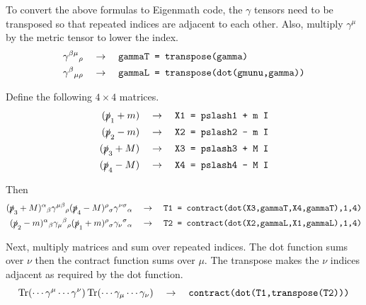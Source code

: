 \documentclass[12pt]{article}
\begin{document}
\noindent
To convert the above formulas to Eigenmath code,
the $\gamma$ tensors need to be transposed
so that repeated indices are adjacent to each other.
Also, multiply $\gamma^\mu$ by the metric tensor to lower the index.
\begin{align*}
\gamma^{\beta\mu}{}_\rho\quad&\rightarrow\quad
\text{\tt gammaT = transpose(gamma)}\\
\gamma^\beta{}_{\mu\rho}\quad&\rightarrow\quad
\text{\tt gammaL = transpose(dot(gmunu,gamma))}
\end{align*}

\noindent
Define the following $4\times4$ matrices.
\begin{align*}
(\slashed{p}_1+m)\quad&\rightarrow\quad\text{\tt X1 = pslash1 + m I}\\
(\slashed{p}_2-m)\quad&\rightarrow\quad\text{\tt X2 = pslash2 - m I}\\
(\slashed{p}_3+M)\quad&\rightarrow\quad\text{\tt X3 = pslash3 + M I}\\
(\slashed{p}_4-M)\quad&\rightarrow\quad\text{\tt X4 = pslash4 - M I}
\end{align*}

\noindent
Then
\begin{align*}
(\slashed{p}_3+M)^\alpha{}_\beta
\gamma^{\mu\beta}{}_\rho
(\slashed{p}_4-M)^\rho{}_\sigma
\gamma^{\nu\sigma}{}_\alpha
\quad&\rightarrow\quad
\text{\tt T1 = contract(dot(X3,gammaT,X4,gammaT),1,4)}
\\
(\slashed{p}_2-m)^\alpha{}_\beta
\gamma_\mu{}^\beta{}_\rho
(\slashed{p}_1+m)^\rho{}_\sigma
\gamma_\nu{}^\sigma{}_\alpha
\quad&\rightarrow\quad
\text{\tt T2 = contract(dot(X2,gammaL,X1,gammaL),1,4)}
\end{align*}

\noindent
Next, multiply matrices and sum over repeated indices.
The dot function sums over $\nu$ then the contract function
sums over $\mu$. The transpose makes the $\nu$ indices adjacent
as required by the dot function.
$$
\mathop{\rm Tr}(\cdots\gamma^\mu\cdots\gamma^\nu)\mathop{\rm Tr}(\cdots\gamma_\mu\cdots\gamma_\nu)
\quad\rightarrow\quad
\text{\tt contract(dot(T1,transpose(T2)))}
$$
\end{document}
